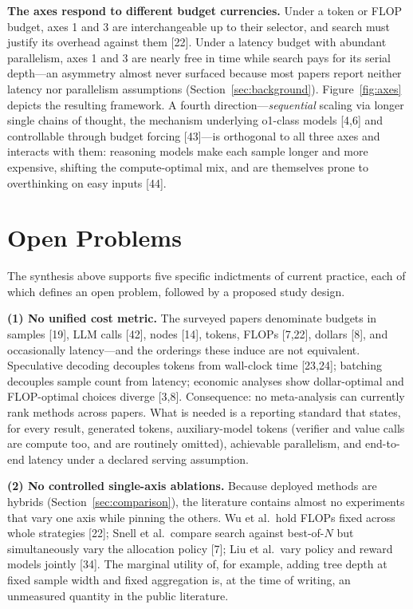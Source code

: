 \documentclass[10pt]{article}
\begin{document}
\textbf{The axes respond to different budget currencies.} Under a token or FLOP budget, axes 1 and 3 are interchangeable up to their selector, and search must justify its overhead against them [22]. Under a latency budget with abundant parallelism, axes 1 and 3 are nearly free in time while search pays for its serial depth---an asymmetry almost never surfaced because most papers report neither latency nor parallelism assumptions (Section~\ref{sec:background}). Figure~\ref{fig:axes} depicts the resulting framework. A fourth direction---\emph{sequential} scaling via longer single chains of thought, the mechanism underlying o1-class models [4,6] and controllable through budget forcing [43]---is orthogonal to all three axes and interacts with them: reasoning models make each sample longer and more expensive, shifting the compute-optimal mix, and are themselves prone to overthinking on easy inputs [44].

\section{Open Problems}
\label{sec:open}

The synthesis above supports five specific indictments of current practice, each of which defines an open problem, followed by a proposed study design.

\textbf{(1) No unified cost metric.} The surveyed papers denominate budgets in samples [19], LLM calls [42], nodes [14], tokens, FLOPs [7,22], dollars [8], and occasionally latency---and the orderings these induce are not equivalent. Speculative decoding decouples tokens from wall-clock time [23,24]; batching decouples sample count from latency; economic analyses show dollar-optimal and FLOP-optimal choices diverge [3,8]. Consequence: no meta-analysis can currently rank methods across papers. What is needed is a reporting standard that states, for every result, generated tokens, auxiliary-model tokens (verifier and value calls are compute too, and are routinely omitted), achievable parallelism, and end-to-end latency under a declared serving assumption.

\textbf{(2) No controlled single-axis ablations.} Because deployed methods are hybrids (Section~\ref{sec:comparison}), the literature contains almost no experiments that vary one axis while pinning the others. Wu et al.\ hold FLOPs fixed across whole strategies [22]; Snell et al.\ compare search against best-of-$N$ but simultaneously vary the allocation policy [7]; Liu et al.\ vary policy and reward models jointly [34]. The marginal utility of, for example, adding tree depth at fixed sample width and fixed aggregation is, at the time of writing, an unmeasured quantity in the public literature.
\end{document}
